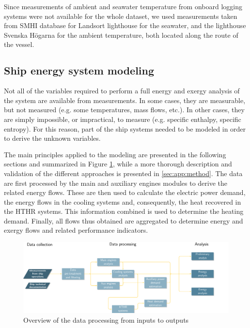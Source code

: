 \documentclass[preprint,12pt]{elsarticle}
\begin{document}
Since measurements of ambient and seawater temperature from onboard logging systems were not available for the whole dataset, we used measurements taken from SMHI database for Landsort lighthouse for the seawater, and the lighthouse Svenska H\"{o}garna for the ambient temperature, both located along the route of the vessel.


\subsection{Ship energy system modeling} \label{sec:met:processing}

Not all of the variables required to perform a full energy and exergy analysis of the system are available from measurements. In some cases, they are measurable, but not measured (e.g. some temperatures, mass flows, etc.). In other cases, they are simply impossible, or impractical, to measure (e.g. specific enthalpy, specific entropy). For this reason, part of the ship systems needed to be modeled in order to derive the unknown variables. 

The main principles applied to the modeling are presented in the following sections and summarized in Figure \ref{fig:dataprocessing}, while a more thorough description and validation of the different approaches is presented in  \ref{sec:app:method}. The data are first processed by the main and auxiliary engines modules to derive the related energy flows. These are then used to calculate the electric power demand, the energy flows in the cooling systems and, consequently, the heat recovered in the HTHR systems. This information combined is used to determine the heating demand. Finally, all flows thus obtained are aggregated to determine energy and exergy flows and related performance indicators.

\begin{figure}
	\centering
	\includegraphics[width=0.99\linewidth]{Figures/dataProcessing}
	\caption{Overview of the data processing from inputs to outputs}
	\label{fig:dataprocessing}
\end{figure}
\end{document}

